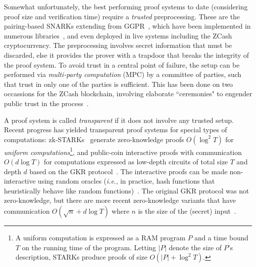 Somewhat unfortunately, the best performing proof systems to date (considering proof size and verification time) require a \emph{trusted} preprocessing. These are the pairing-based SNARKs extending from GGPR~\cite{EC:GGPR13,ES:SBVBPW13,SP:PHGR13,TCC:BCIOP13,C:BCGTV13,USENIX:BCTV14,EC:Groth16}, which have been implemented in numerous libraries~\cite{C:BCGTV13,bellman}, and even deployed in live systems including the ZCash~\cite{Zcash} cryptocurrency. The preprocessing involves secret information that must be discarded, else it provides the prover with a trapdoor that breaks the integrity of the proof system. To avoid trust in a central point of failure, the setup can be performed via \emph{multi-party computation} (MPC) by a committee of parties, such that trust in only one of the parties is sufficient. This has been done on two occassions for the ZCash blockchain, involving elaborate ``ceremonies" to engender public trust in the process~\cite{ZcashCeremony}. 

A proof system is called \emph{transparent} if it does not involve any trusted setup. Recent progress has yielded transparent proof systems for special types of computations: zk-STARKs~\cite{ICALP:BBHR18} generate zero-knowledge proofs $O(\log^2 T)$ for \emph{uniform computations}\footnote{A uniform computation is expressed as a RAM program $P$ and a time bound $T$ on the running time of the program. Letting $|P|$ denote the size of $P$'s description, STARKs produce proofs of size $O(|P| + \log^2 T)$.}, and public-coin interactive proofs with communication $O(d \log T)$ for computations expressed as low-depth circuits of total size $T$ and depth $d$ based on the GKR protocol~\cite{STOC:GolKalRot08}. The interactive proofs can be made non-interactive using random oracles (\emph{i.e.}, in practice, hash functions that heuristically behave like random functions)~\cite{C:FiaSha86,STOC:CCHLRRW19}. The original GKR protocol was not zero-knowledge, but there are more recent zero-knowledge variants that have communication $O( \sqrt{n} + d \log T)$ where $n$ is the size of the (secret) input~\cite{SP:WTSTW18,EPRINT:ZGKPP17b}. 

